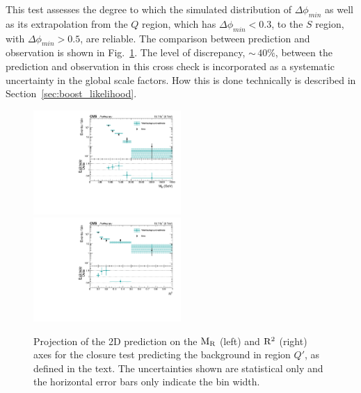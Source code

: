 This test assesses the degree to which the simulated distribution of $\Delta\phi_{min}$ as well as
its extrapolation from the $Q$ region, which has $\Delta\phi_{min} < 0.3$, to the $S$ region, with
$\Delta\phi_{min} > 0.5$, are reliable. The comparison between
prediction and observation is shown in Fig.~\ref{fig:Shape_syst_1D_project_QCD}. 
The level of discrepancy, ${\sim}\,40\%$, between the prediction and observation in this cross
check is incorporated as a systematic uncertainty in the global scale factors. How this is done
technically is described in Section~\ref{sec:boost_likelihood}.

\begin{figure}[htpb]
\includegraphics[width=0.5\textwidth]
{figures/razor_selection/MR_comparison_data_estimate_0Lbg1uW0Ll_mdPhig0p5_from_0Lbg1uW0Ll_mdPhi0p3_log}
\includegraphics[width=0.5\textwidth]
{figures/razor_selection/R2_comparison_data_estimate_0Lbg1uW0Ll_mdPhig0p5_from_0Lbg1uW0Ll_mdPhi0p3_log}
\caption{Projection of the 2D prediction on the $\mathrm{M_R}$ (left) and $\mathrm{R^2}$ (right) axes for the closure
test predicting the background in region $Q'$, as defined in the text. The uncertainties shown are
statistical only and the horizontal error bars only indicate the bin width.
\label{fig:Shape_syst_1D_project_QCD}}
\end{figure}

